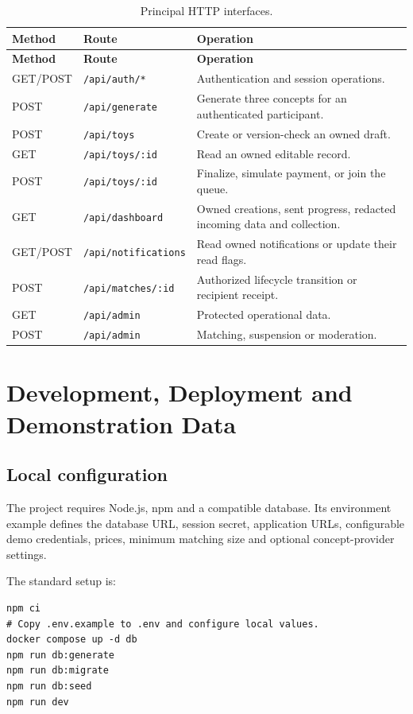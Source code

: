 \documentclass[11pt,a4paper]{article}
\begin{document}
\begin{longtable}{p{1.3cm}p{4.6cm}p{7.8cm}}
\caption{Principal HTTP interfaces.}\\
\toprule\textbf{Method} & \textbf{Route} & \textbf{Operation}\\
\midrule\endfirsthead
\toprule\textbf{Method} & \textbf{Route} & \textbf{Operation}\\
\midrule\endhead
GET/POST & \texttt{/api/auth/*} & Authentication and session operations.\\
POST & \texttt{/api/generate} & Generate three concepts for an authenticated participant.\\
POST & \texttt{/api/toys} & Create or version-check an owned draft.\\
GET & \texttt{/api/toys/:id} & Read an owned editable record.\\
POST & \texttt{/api/toys/:id} & Finalize, simulate payment, or join the queue.\\
GET & \texttt{/api/dashboard} & Owned creations, sent progress, redacted incoming data and collection.\\
GET/POST & \texttt{/api/notifications} & Read owned notifications or update their read flags.\\
POST & \texttt{/api/matches/:id} & Authorized lifecycle transition or recipient receipt.\\
GET & \texttt{/api/admin} & Protected operational data.\\
POST & \texttt{/api/admin} & Matching, suspension or moderation.\\
\bottomrule
\end{longtable}

\section{Development, Deployment and Demonstration Data}

\subsection{Local configuration}
The project requires Node.js, npm and a compatible database. Its environment example defines the database URL, session secret, application URLs, configurable demo credentials, prices, minimum matching size and optional concept-provider settings.

The standard setup is:
\begin{lstlisting}
npm ci
# Copy .env.example to .env and configure local values.
docker compose up -d db
npm run db:generate
npm run db:migrate
npm run db:seed
npm run dev
\end{lstlisting}
\end{document}
